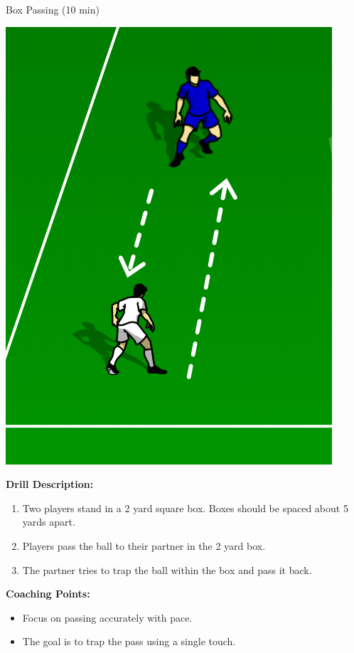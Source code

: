 \begin{oddBlock}{Box Passing (10 min)}

\begin{minipage}[t]{\linewidth}
    \centering
    
    \begin{minipage}{.3\linewidth} %
            \includegraphics[width=.6\textwidth]{../img/Trimmed/Lane_Passing}
    \end{minipage}
    \hspace{0.05\linewidth}
    \begin{minipage}{.6\linewidth} %
        \textbf{Drill Description:}

        \begin{enumerate}
        \setlength{\itemsep}{0pt}
        \setlength{\parskip}{0pt}
        \setlength{\parsep}{0pt}
        \item Two players stand in a 2 yard square box.  Boxes should be spaced about 5 yards apart.
        \item Players pass the ball to their partner in the 2 yard box.
        \item The partner tries to trap the ball within the box and pass it back.
        \end{enumerate}

        \textbf{Coaching Points:}
        \begin{itemize}
        \setlength{\itemsep}{0pt}
        \setlength{\parskip}{0pt}
        \setlength{\parsep}{0pt}
        \item Focus on passing accurately with pace.
        \item The goal is to trap the pass using a single touch.
        \end{itemize}

    \end{minipage}
\end{minipage}

\end{oddBlock}